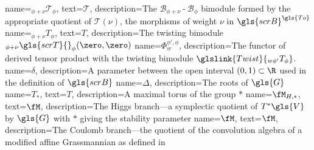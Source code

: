     {
     name={\ensuremath{ {}_{\phi+\nu}\mathscr{T}{}_{\phi}}},
     text={\ensuremath{ \mathscr{T}}},
   description={The $\mathscr{B}_{\phi+\nu}\operatorname{-}\mathscr{B}_{\phi}$
  bimodule formed by the appropriate quotient of
  $\mathscr{T}(\nu)$, the morphisms of weight $\nu$ in $\gls{scrB}^{\gls{To}}$ }
 }
     {
     name={\ensuremath{ {}_{\phi+\nu}{T}{}_{\phi}}},
     text={\ensuremath{{T}}},
   description={The twisting bimodule $ {}_{\phi+\nu}\gls{scrT}{}_{\phi}(\zero,\zero)$
 }}
    {
     name={\ensuremath{\Phi_w^{\phi',\phi}}},
   description={The functor of derived tensor product with the
  twisting bimodule $\glslink{Twist}{{}_{w\phi'}T_{\phi}}$.
 }}
    {
   name={\ensuremath{\delta}},
   description={A parameter between the open interval $(0,1)\subset \R$ used in the definition of $\gls{scrB}$}
 }
   {
   name={\ensuremath{\Delta}},
   description={The roots of $\gls{G}$}
 }
    {
     name={\ensuremath{T_*}},
     text={\ensuremath{T}},
   description={A maximal torus of the group $*$}
 }
    {
     name={\ensuremath{\fM_{H,*}}},
     text={\ensuremath{\fM}},
   description={The Higgs branch---a symplectic quotient of $T^*\gls{V}$ by $\gls{G}$ with $*$ giving the stability parameter}
 }
     {
     name={\ensuremath{\fM}},
     text={\ensuremath{\fM}},
   description={The Coulomb branch---the quotient of the convolution algebra of a modified affine Grassmannian as defined in \cite{BFN}}
 }
  
